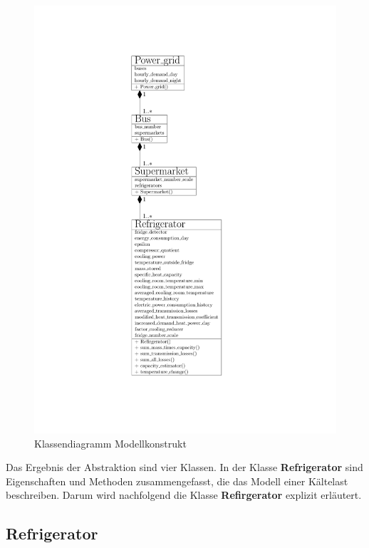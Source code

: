 \begin{figure}[h!]
	\begin{center}
	\includegraphics[scale=0.7]{images/Theorie_Super/class_new_diagramm}
	\end{center}
\caption{Klassendiagramm Modellkonstrukt}
\label{fig:klassendiagramm}
\end{figure}

Das Ergebnis der Abstraktion sind vier Klassen. In der Klasse
\textbf{Refrigerator} sind Eigenschaften und Methoden zusammengefasst, die das
Modell einer K\"altelast beschreiben. Darum wird nachfolgend die Klasse
\textbf{Refirgerator} explizit erl\"autert.

\subsection*{Refrigerator}

